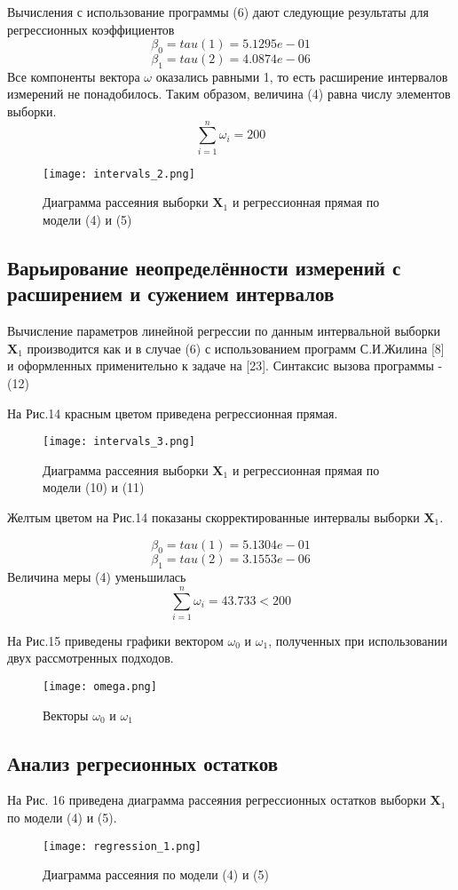 \documentclass{article}
\begin{document}
 Вычисления с использование программы (6) дают следующие результаты для регрессионных коэффициентов 
 $$
 \beta_0 = tau(1) = 5.1295e-01
 $$$$
 \beta_1 = tau(2) = 4.0874e-06
 $$
 Все компоненты вектора $\omega$ оказались равными 1, то есть расширение интервалов измерений не понадобилось. Таким образом, величина (4) равна числу элементов выборки.
 $$\sum\limits_{i=1}^n \omega_i = 200$$
	\begin{figure}[H]
		\centering
		\texttt{[image: intervals\_2.png]}
		\caption{Диаграмма рассеяния выборки $\mathbf{X}_1$ и регрессионная прямая
			по модели (4) и (5)}
	\end{figure}

	

	\subsection{Варьирование неопределённости измерений с расширением и сужением интервалов}
 Вычисление параметров линейной регрессии по данным интервальной выборки $\mathbf{X}_1$ производится как и в случае (6) с использованием программ С.И.Жилина [8] и оформленных применительно к задаче на [23]. Синтаксис вызова программы - (12)

 На Рис.14 красным цветом приведена регрессионная прямая. 
	
	\begin{figure}[H]
		\centering
		\texttt{[image: intervals\_3.png]}
		\caption{Диаграмма рассеяния выборки $\mathbf{X}_1$ и регрессионная прямая
			по модели (10) и (11)}
	\end{figure}
 Желтым цветом на Рис.14 показаны скорректированные интервалы выборки $\mathbf{X}_1$. 

 $$
 \beta_0 = tau(1) = 5.1304e-01
 $$$$
 \beta_1 = tau(2) = 3.1553e-06
 $$
 Величина меры (4) уменьшилась
 $$\sum\limits_{i=1}^n \omega_i = 43.733 < 200$$

На Рис.15 приведены графики вектором $\omega_0$ и $\omega_1$, полученных при использовании двух рассмотренных подходов. 
	
	\begin{figure}[H]
		\centering
		\texttt{[image: omega.png]}
		\caption{Векторы $\omega_0$ и $\omega_1$}
	\end{figure}
	
	\subsection{Анализ регресионных остатков}
	На Рис. 16 приведена диаграмма рассеяния регрессионных остатков выборки $\mathbf{X}_1$ по модели (4) и (5).
	\begin{figure}[H]
		\centering
		\texttt{[image: regression\_1.png]}
		\caption{Диаграмма рассеяния по модели (4) и (5)}
	\end{figure}
\end{document}
